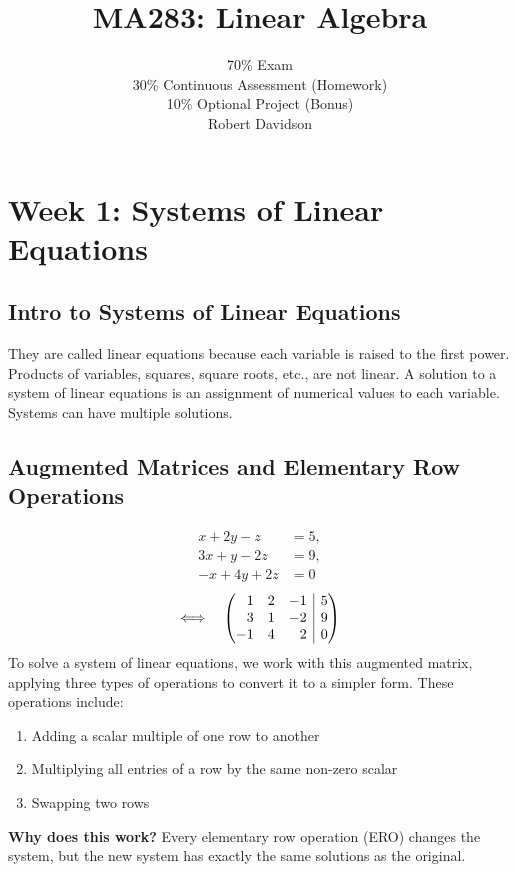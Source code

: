 \documentclass[a4paper, 10pt]{article}
\title{
\textbf{MA283: Linear Algebra} \\ 
}
\author{
  70\% Exam\\
30\% Continuous Assessment (Homework) \\
10\% Optional Project (Bonus)\\ [2ex]
Robert Davidson
}
\date{}       %
\begin{document}
\maketitle
\pagebreak

\tableofcontents
\pagebreak

\section{Week 1: Systems of Linear Equations}

\subsection{Intro to Systems of Linear Equations}
They are called linear equations because each variable is raised to the first power. Products of variables, squares, square roots, etc., are not linear.
A solution to a system of linear equations is an assignment of numerical values to each variable. Systems can have multiple solutions.

\subsection{Augmented Matrices and Elementary Row Operations}

\begin{align}
  x + 2y - z   & = 5, \\
  3x + y - 2z  & = 9, \\
  -x + 4y + 2z & = 0
\end{align}
\[
  \Longleftrightarrow
  \quad
  \left(\begin{array}{@{} r r r | r @{}}
      1  & 2 & -1 & 5 \\
      3  & 1 & -2 & 9 \\
      -1 & 4 & 2  & 0
    \end{array}\right)
\]
To solve a system of linear equations, we work with this augmented matrix,
applying three types of operations to convert it to a simpler form. These operations include:
\begin{enumerate}
  \item Adding a scalar multiple of one row to another
  \item Multiplying all entries of a row by the same non-zero scalar
  \item Swapping two rows
\end{enumerate}
\textbf{Why does this work?} Every elementary row operation (ERO) changes the system, but the new system has exactly the same solutions as the original.
\end{document}
